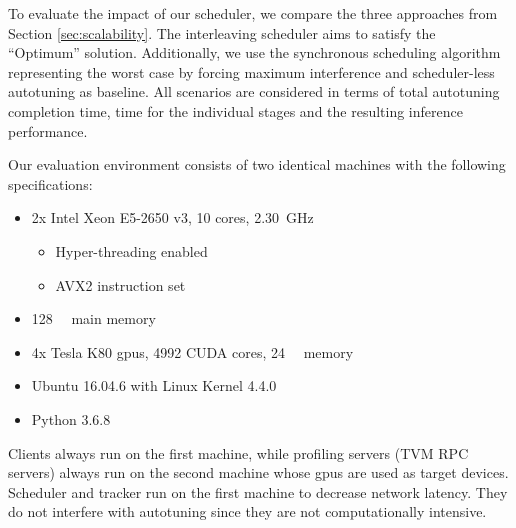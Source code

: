 To evaluate the impact of our scheduler, we compare the three approaches from Section \ref{sec:scalability}. The interleaving scheduler aims to satisfy the \enquote{Optimum} solution. Additionally, we use the synchronous scheduling algorithm representing the worst case by forcing maximum interference and scheduler-less autotuning as baseline. All scenarios are considered in terms of total autotuning completion time, time for the individual stages and the resulting inference performance.

Our evaluation environment consists of two identical machines with the following specifications:
\begin{itemize}
	\item 2x Intel Xeon E5-2650 v3, 10 cores, \SI{2.30}{\giga\hertz}
	\begin{itemize}
		\item Hyper-threading enabled
		\item AVX2 instruction set
	\end{itemize}
	\item \SI{128}{\giga\byte} main memory
	\item 4x Tesla K80 \glspl{gpu}, 4992 CUDA cores, \SI{24}{\giga\byte} memory
	\item Ubuntu 16.04.6 with Linux Kernel 4.4.0
	\item Python 3.6.8
\end{itemize}

Clients always run on the first machine, while profiling servers (TVM RPC servers) always run on the second machine whose \glspl{gpu} are used as target devices. Scheduler and tracker run on the first machine to decrease network latency. They do not interfere with autotuning since they are not computationally intensive.

